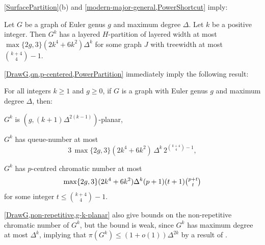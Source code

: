 \documentclass{patmorin}
\newcommand{\note}[2]{{\color{red}[#1:~#2]}}
\DeclareMathOperator{\qn}{qn}
\DeclarePairedDelimiter{\floor}{\lfloor}{\rfloor}
\renewcommand{\le}{\leqslant}
\renewcommand{\geq}{\geqslant}
\renewcommand{\leq}{\leqslant}
\begin{document}
\cref{SurfacePartition}(b) and \cref{modern-major-general,PowerShortcut} imply:

\begin{thm}
\label{PowerPartition}
Let $G$ be a graph of Euler genus $g$ and maximum degree $\Delta$. Let $k$ be a positive integer. 
Then $G^k$ has a layered $H$-partition of layered width at most $\max\{2g,3\} (2k^4+6k^2) \Delta^{k}$ for some graph $J$ with treewidth at most $\binom{k+4}{4}-1$.
\end{thm}

\cref{DrawG,qn,p-centered,PowerPartition} immediately imply the following result:



\begin{cor}
For all integers $k\geq 1$ and $g\geq 0$, if $G$ is a graph with Euler genus $g$ and maximum degree $\Delta$, then:
\begin{compactitem}
\item $G^k$ is $(g, (k+1)\Delta^{2(k-1)} )$-planar, 
\item $G^k$ has queue-number at most 
$$3\,\max\{2g,3\} (2k^4+6k^2) \,\Delta^{k}\, 2^{\binom{k+4}{4}-1},$$
\item $G^k$ has  $p$-centred chromatic number at most 
$$\max\{2g,3\}(2k^4+6k^2) \Delta^{k}  (p+1) (t+1)\tbinom{p+t}{t}$$
for some integer $t \leq \binom{k+4}{4}-1$. 
\end{compactitem}
\end{cor}

\cref{DrawG,non-repetitive,g-k-planar} also give bounds on the non-repetitive chromatic number of $G^k$, 
but the bound is weak, since $G^k$ has maximum degree at most $\Delta^k$, implying that $\pi(G^k) \leq (1+o(1))\Delta^{2k}$ by a result of \citet{DJKW16}.
\end{document}
